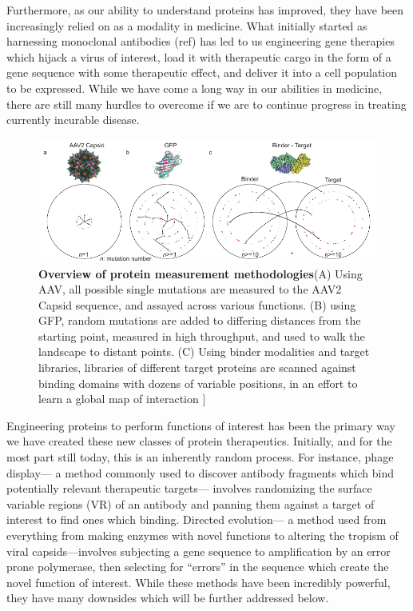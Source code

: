 Furthermore, as our ability to understand proteins has improved, they have been increasingly relied on as a modality in medicine. What initially started as harnessing monoclonal antibodies (ref) has led to us engineering gene therapies which hijack a virus of interest, load it with therapeutic cargo in the form of a gene sequence with some therapeutic effect, and deliver it into a cell population to be expressed. While we have come a long way in our abilities in medicine, there are still many hurdles to overcome if we are to continue progress in treating currently incurable disease. 

\begin{figure}[t!]
\includegraphics[width=\textwidth]{figures/20190612_x03_landscape_walks.pdf}
\caption[Overview of protein measurement methodologies]{\textbf{Overview of protein measurement methodologies}(A) Using AAV, all possible single mutations are measured to the AAV2 Capsid sequence, and assayed across various functions. (B) using GFP, random mutations are added to differing distances from the starting point, measured in high throughput, and used to walk the landscape to distant points. (C) Using binder modalities and target libraries, libraries of different target proteins are scanned against binding domains with dozens of variable positions, in an effort to learn a global map of interaction ]
\label{fig:Figure 0.0}}
\end{figure}

Engineering proteins to perform functions of interest has been the primary way we have created these new classes of protein therapeutics. Initially, and for the most part still today, this is an inherently random process. For instance, phage display--- a method commonly used to discover antibody fragments which bind potentially relevant therapeutic targets--- involves randomizing the surface variable regions (VR) of an antibody and panning them against a target of interest to find ones which binding. Directed evolution--- a method used from everything from making enzymes with novel functions to altering the tropism of viral capsids---involves subjecting a gene sequence to amplification by an error prone polymerase, then selecting for “errors” in the sequence which create the novel function of interest. While these methods have been incredibly powerful, they have many downsides which will be further addressed below. 

